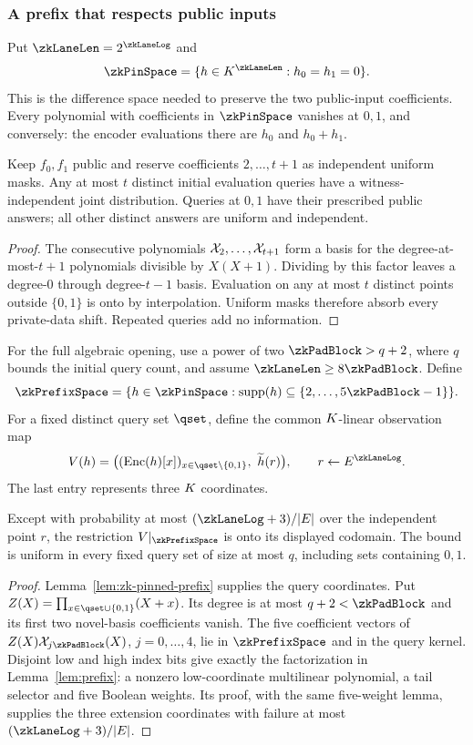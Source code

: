 \subsubsection{A prefix that respects public inputs}

Put $\zkLaneLen=2^{\zkLaneLog}$ and
\[
 \zkPinSpace=\{h\in\K^{\zkLaneLen}:h_0=h_1=0\}.
\]
This is the difference space needed to preserve the two public-input coefficients. Every polynomial with coefficients in $\zkPinSpace$ vanishes at $0,1$, and conversely: the encoder evaluations there are $h_0$ and $h_0+h_1$.

\begin{lemma}\label{lem:zk-pinned-prefix}
Keep $f_0,f_1$ public and reserve coefficients $2,\ldots,t+1$ as independent uniform masks. Any at most $t$ distinct initial evaluation queries have a witness-independent joint distribution. Queries at $0,1$ have their prescribed public answers; all other distinct answers are uniform and independent.
\end{lemma}
\begin{proof}
The consecutive polynomials $\mathcal{X}_2,\ldots,\mathcal{X}_{t+1}$ form a basis for the degree-at-most-$t+1$ polynomials divisible by $X(X+1)$. Dividing by this factor leaves a degree-$0$ through degree-$t-1$ basis. Evaluation on any at most $t$ distinct points outside $\{0,1\}$ is onto by interpolation. Uniform masks therefore absorb every private-data shift. Repeated queries add no information.
\end{proof}

For the full algebraic opening, use a power of two $\zkPadBlock>q+2$, where $q$ bounds the initial query count, and assume $\zkLaneLen\ge8\zkPadBlock$. Define
\[
 \zkPrefixSpace=\{h\in\zkPinSpace:\operatorname{supp}(h)\subseteq\{2,\ldots,5\zkPadBlock-1\}\}.
\]
For a fixed distinct query set $\qset$, define the common $K$-linear observation map
\[
 V(h)=\bigl((\Enc(h)[x])_{x\in\qset\setminus\{0,1\}},\ \mle h(r)\bigr),
 \qquad r\gets\E^{\zkLaneLog}.
\]
The last entry represents three $K$ coordinates.

\begin{lemma}\label{lem:zk-pinned-envelope-prefix}
Except with probability at most $(\zkLaneLog+3)/|\E|$ over the independent point $r$, the restriction $V|_{\zkPrefixSpace}$ is onto its displayed codomain. The bound is uniform in every fixed query set of size at most $q$, including sets containing $0,1$.
\end{lemma}
\begin{proof}
Lemma~\ref{lem:zk-pinned-prefix} supplies the query coordinates. Put $Z(X)=\prod_{x\in\qset\cup\{0,1\}}(X+x)$. Its degree is at most $q+2<\zkPadBlock$ and its first two novel-basis coefficients vanish. The five coefficient vectors of $Z(X)\novel_{j\zkPadBlock}(X)$, $j=0,\ldots,4$, lie in $\zkPrefixSpace$ and in the query kernel. Disjoint low and high index bits give exactly the factorization in Lemma~\ref{lem:prefix}: a nonzero low-coordinate multilinear polynomial, a tail selector and five Boolean weights. Its proof, with the same five-weight lemma, supplies the three extension coordinates with failure at most $(\zkLaneLog+3)/|\E|$.
\end{proof}

